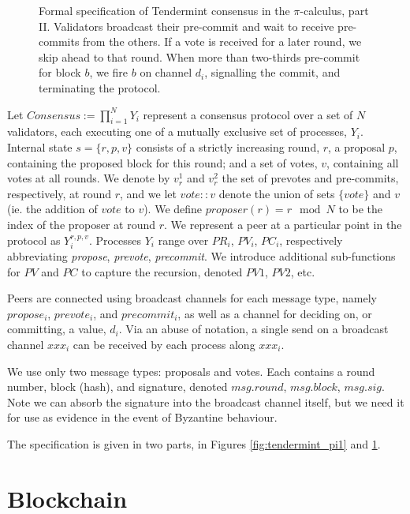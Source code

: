 \begin{figure}[]
    	\centering
	
	\caption[Formal specification of Tendermint consensus in the $\pi$-calculus, part II]{Formal specification of Tendermint consensus in the $\pi$-calculus, part II.
Validators broadcast their pre-commit and wait to receive pre-commits from the others.
If a vote is received for a later round, we skip ahead to that round.
When more than two-thirds pre-commit for block $b$, we fire $b$ on channel $d_i$, signalling the commit,
and terminating the protocol.
}
	\label{fig:tendermint_pi2}
\end{figure}


Let $Consensus := \prod_{i=1}^N Y_i $ represent a consensus protocol
over a set of $N$ validators, each executing one of a mutually exclusive set of processes, $Y_i$.
Internal state $s = \{r, p, v \}$ consists of a strictly increasing round, $r$,
a proposal $p$, containing the proposed block for this round;
and a set of votes, $v$, containing all votes at all rounds.
We denote by $v_r^1$ and $v_r^2$ the set of prevotes and pre-commits, respectively, at round $r$,
and we let $vote::v$ denote the union of sets $\{vote\}$ and $v$ (ie. the addition of $vote$ to $v$).
We define $proposer(r) = r \mod N$ to be the index of the proposer at round $r$.
We represent a peer at a particular point in the protocol as $Y_i^{r, p, v}$.
Processes $Y_i$ range over $PR_i$, $PV_i$, $PC_i$, 
respectively abbreviating 
\emph{propose}, \emph{prevote}, \emph{precommit}.
We introduce additional sub-functions for $PV$ and $PC$ to capture the recursion,
denoted $PV1$, $PV2$, etc.

Peers are connected using broadcast channels for each message type,
namely $propose_i$, $prevote_i$, and $precommit_i$,
as well as a channel for deciding on, or committing, a value, $d_i$.
Via an abuse of notation, a single send on a broadcast channel $xxx_i$ can be received by each process along
$xxx_i$.

We use only two message types: proposals and votes. 
Each contains a round number, block (hash), and signature, 
denoted $msg.round$, $msg.block$, $msg.sig$.
Note we can absorb the signature into the broadcast channel itself,
but we need it for use as evidence in the event of Byzantine behaviour.

The specification is given in two parts, in Figures \ref{fig:tendermint_pi1} and \ref{fig:tendermint_pi2}.

\section{Blockchain}

